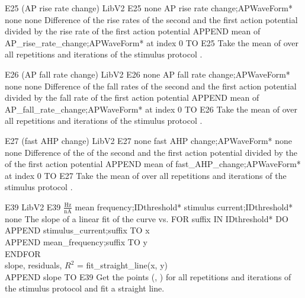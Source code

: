 \begin{efeature}
  {E25 (AP rise rate change)}
  {LibV2}
  {E25}
  {none}
  {AP rise rate change;APWaveForm*}
  {none}
  {none}
  {Difference of the rise rates of the second and the first action potential divided by the rise rate of the first action potential}
  {
  APPEND mean of AP\_rise\_rate\_change;APWaveForm* at index 0 TO E25
  }
  Take the mean of  over all repetitions and iterations of the stimulus protocol .
  
\end{efeature}

\begin{efeature}
  {E26 (AP fall rate change)}
  {LibV2}
  {E26}
  {none}
  {AP fall rate change;APWaveForm*}
  {none}
  {none}
  {Difference of the fall rates of the second and the first action potential divided by the fall rate of the first action potential}
  {
  APPEND mean of AP\_fall\_rate\_change;APWaveForm* at index 0 TO E26
  }
  Take the mean of  over all repetitions and iterations of the stimulus protocol .
  
\end{efeature}

\begin{efeature}
  {E27 (fast AHP change)}
  {LibV2}
  {E27}
  {none}
  {fast AHP change;APWaveForm*}
  {none}
  {none}
  {Difference of the  of the second and the first action potential divided by the  of the first action potential}
  {
  APPEND mean of fast\_AHP\_change;APWaveForm* at index 0 TO E27
  }
  Take the mean of  over all repetitions and iterations of the stimulus protocol .
  
\end{efeature}

\begin{efeature}
  {E39}
  {LibV2}
  {E39}
  {$\frac{\mathrm{Hz}}{\mathrm{nA}}$}
  {mean frequency;IDthreshold*}
  {stimulus current;IDthreshold*}
  {none}
  {The slope of a linear fit of the curve  vs. }
  {
  FOR suffix IN IDthreshold* DO \+ \\
    APPEND stimulus\_current;suffix TO x \\
    APPEND mean\_frequency;suffix TO y \- \\
  ENDFOR \\
  slope, residuals, $R^2$ = fit\_straight\_line(x, y) \\
  APPEND slope TO E39
  }
  Get the points (, ) for all repetitions and iterations of the stimulus protocol  and fit a straight line.

\end{efeature}

